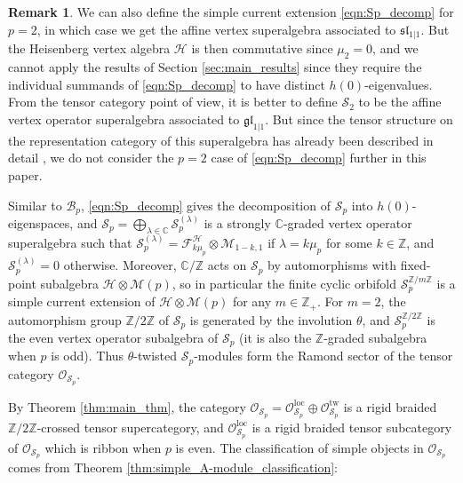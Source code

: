 \documentclass[11pt, reqno]{amsart}
\theoremstyle{definition}\newtheorem{defi}[thm]{Definition}
\theoremstyle{definition}\newtheorem{rem}[thm]{Remark}
\theoremstyle{definition}\newtheorem{exam}[thm]{Example}
\theoremstyle{definition}\newtheorem{assum}[thm]{Assumption}
\newcommand{\cB}{\mathcal{B}}
\newcommand{\cH}{\mathcal{H}}
\newcommand{\cM}{\mathcal{M}}
\newcommand{\cS}{\mathcal{S}}
\newcommand{\cF}{\mathcal{F}}
\newcommand{\cO}{\mathcal{O}}
\newcommand{\CC}{\mathbb{C}}
\newcommand{\ZZ}{\mathbb{Z}}
\newcommand{\Oloc}{\cO^{\mathrm{loc}}}
\newcommand{\Otw}{\cO^{\mathrm{tw}}}
\begin{document}
\begin{rem}
We can also define the simple current extension \eqref{eqn:Sp_decomp} for $p=2$, in which case we get the affine vertex superalgebra associated to $\mathfrak{sl}_{1\vert 1}$. But the Heisenberg vertex algebra $\cH$ is then commutative since $\mu_2=0$, and we cannot apply the results of Section \ref{sec:main_results} since they require the individual summands of \eqref{eqn:Sp_decomp} to have distinct $h(0)$-eigenvalues. From the tensor category point of view, it is better to define $\mathcal{S}_2$ to be the affine vertex operator superalgebra associated to $\mathfrak{gl}_{1\vert 1}$. But since the tensor structure on the representation category of this superalgebra has already been described in detail \cite{CMY3}, we do not consider the $p=2$ case of \eqref{eqn:Sp_decomp} further in this paper. 
\end{rem}



Similar to $\cB_p$, \eqref{eqn:Sp_decomp} gives the decomposition of $\cS_p$ into $h(0)$-eigenspaces, and $\cS_p=\bigoplus_{\lambda\in\CC} \cS_p^{(\lambda)}$ is a strongly $\CC$-graded vertex operator superalgebra such that $\cS_p^{(\lambda)}=\cF^\cH_{k\mu_p}\otimes\cM_{1-k,1}$ if $\lambda=k\mu_p$ for some $k\in\ZZ$, and $\cS_p^{(\lambda)}=0$ otherwise. Moreover, $\CC/\ZZ$ acts on $\cS_p$ by automorphisms with fixed-point subalgebra $\cH\otimes\cM(p)$, so in particular the finite cyclic orbifold $\cS_p^{\ZZ/m\ZZ}$ is a simple current extension of $\cH\otimes\cM(p)$ for any $m\in\ZZ_+$. For $m=2$, the automorphism group $\ZZ/2\ZZ$ of $\cS_p$ is generated by the involution $\theta$, and $\cS_p^{\ZZ/2\ZZ}$ is the even vertex operator subalgebra of $\cS_p$ (it is also the $\ZZ$-graded subalgebra when $p$ is odd). Thus $\theta$-twisted $\cS_p$-modules form the Ramond sector of the tensor category $\cO_{\cS_p}$.

By Theorem \ref{thm:main_thm}, the category $\cO_{\cS_p}=\Oloc_{\cS_p}\oplus\Otw_{\cS_p}$ is a rigid braided $\ZZ/2\ZZ$-crossed tensor supercategory, and $\Oloc_{\cS_p}$ is a rigid braided tensor subcategory of $\cO_{\cS_p}$ which is ribbon when $p$ is even. The classification of simple objects in $\cO_{\cS_p}$ comes from Theorem \ref{thm:simple_A-module_classification}:
\end{document}
